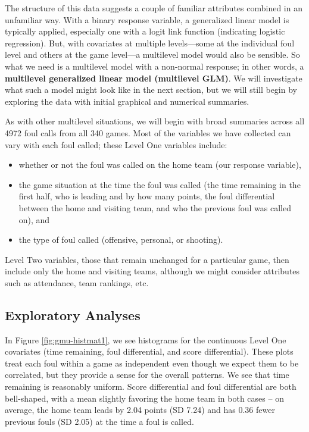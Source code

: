 \documentclass[
]{krantz}
\providecommand{\tightlist}{%
  \setlength{\itemsep}{0pt}\setlength{\parskip}{0pt}}
\begin{document}
The structure of this data suggests a couple of familiar attributes combined in an unfamiliar way. With a binary response variable, a generalized linear model is typically applied, especially one with a logit link function (indicating logistic regression). But, with covariates at multiple levels---some at the individual foul level and others at the game level---a multilevel model would also be sensible. So what we need is a multilevel model with a non-normal response; in other words, a \textbf{multilevel generalized linear model (multilevel GLM)}.  We will investigate what such a model might look like in the next section, but we will still begin by exploring the data with initial graphical and numerical summaries.

As with other multilevel situations, we will begin with broad summaries across all 4972 foul calls from all 340 games. Most of the variables we have collected can vary with each foul called; these Level One variables include:

\begin{itemize}
\tightlist
\item
  whether or not the foul was called on the home team (our response variable),
\item
  the game situation at the time the foul was called (the time remaining in the first half, who is leading and by how many points, the foul differential between the home and visiting team, and who the previous foul was called on), and
\item
  the type of foul called (offensive, personal, or shooting).
\end{itemize}

Level Two variables, those that remain unchanged for a particular game, then include only the home and visiting teams, although we might consider attributes such as attendance, team rankings, etc.

\subsection{Exploratory Analyses}\label{glmm-eda}

In Figure \ref{fig:gmu-histmat1}, we see histograms for the continuous Level One covariates (time remaining, foul differential, and score differential). These plots treat each foul within a game as independent even though we expect them to be correlated, but they provide a sense for the overall patterns. We see that time remaining is reasonably uniform. Score differential and foul differential are both bell-shaped, with a mean slightly favoring the home team in both cases -- on average, the home team leads by 2.04 points (SD 7.24) and has 0.36 fewer previous fouls (SD 2.05) at the time a foul is called.
\end{document}
